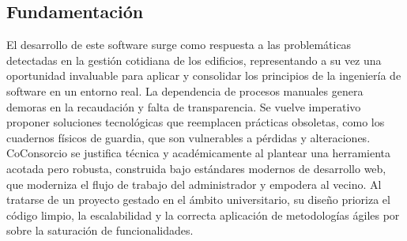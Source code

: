 \subsection{Fundamentación}

El desarrollo de este software surge como respuesta a las problemáticas detectadas en la gestión cotidiana de los edificios, representando a su vez una oportunidad invaluable para aplicar y consolidar los principios de la ingeniería de software en un entorno real. La dependencia de procesos manuales genera demoras en la recaudación y falta de transparencia. Se vuelve imperativo proponer soluciones tecnológicas que reemplacen prácticas obsoletas, como los cuadernos físicos de guardia, que son vulnerables a pérdidas y alteraciones. CoConsorcio se justifica técnica y académicamente al plantear una herramienta acotada pero robusta, construida bajo estándares modernos de desarrollo web, que moderniza el flujo de trabajo del administrador y empodera al vecino. Al tratarse de un proyecto gestado en el ámbito universitario, su diseño prioriza el código limpio, la escalabilidad y la correcta aplicación de metodologías ágiles por sobre la saturación de funcionalidades.

